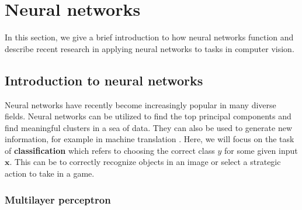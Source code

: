 

\section{Neural networks}
\label{sec:networks}
In this section, we give a brief introduction to how neural networks function and describe recent research in applying neural networks to tasks in computer vision.

\subsection{Introduction to neural networks}

Neural networks have recently become increasingly popular in many diverse fields.
Neural networks can be utilized to find the top principal components and find meaningful clusters in a sea of data. They can also be used to generate new information, for example in machine translation \cite{machine_translation_attention}. Here, we will focus on the task of \textbf{classification} which refers to choosing the correct class $y$ for some given input $\mathbf{x}$. This can be to correctly recognize objects in an image or select a strategic action to take in a game.

\subsubsection{Multilayer perceptron}

